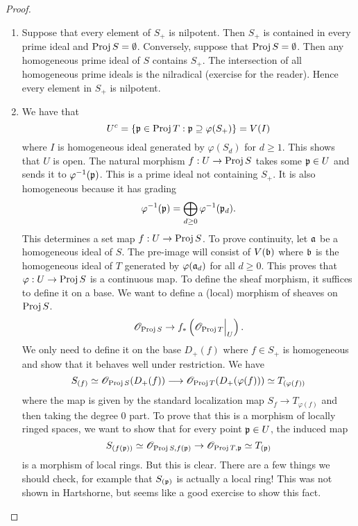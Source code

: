\documentclass[]{pcmi}
\theoremstyle{plain}
\theoremstyle{definition}
\theoremstyle{remark}
\begin{document}
\begin{proof}
    \phantom{h}
    \begin{enumerate}[label = (\alph*)]
        \item Suppose that every element of $S_+$ is nilpotent. Then $S_+$ is contained in every prime ideal and $\operatorname{Proj} S = \emptyset$. Conversely, suppose that $\operatorname{Proj} S = \emptyset$. Then any homogeneous prime ideal of $S$ contains $S_+$. The intersection of all homogeneous prime ideals is the nilradical (exercise for the reader). Hence every element in $S_+$ is nilpotent. 
        \item We have that  
        \[
            U^c = \left\{ \mathfrak{p} \in \operatorname{Proj} T : \mathfrak{p} \supseteq \varphi(S_+) \right\} = V(I)
        \]
        where $I$ is homogeneous ideal generated by $\varphi(S_d)$ for $d \geq 1$. This shows that $U$ is open. The natural morphism $f : U \to \operatorname{Proj} S$ takes some $\mathfrak{p} \in U$ and sends it to $\varphi^{-1}(\mathfrak{p})$. This is a prime ideal not containing $S_+$. It is also homogeneous because it has grading 
        \[
            \varphi^{-1}(\mathfrak{p}) = \bigoplus_{d \geq 0} \varphi^{-1}(\mathfrak{p}_d). 
        \]
        This determines a set map $f : U \to \operatorname{Proj} S$. To prove continuity, let $\mathfrak{a}$ be a homogeneous ideal of $S$. The pre-image will consist of $V(\mathfrak{b})$ where $\mathfrak{b}$ is the homogeneous ideal of $T$ generated by $\varphi(\mathfrak{a}_d)$ for all $d \geq 0$. This proves that $\varphi : U \to \operatorname{Proj} S$ is a continuous map. To define the sheaf morphism, it suffices to define it on a base. We want to define a (local) morphism of sheaves on $\operatorname{Proj} S$. 
        \[
            \mathscr{O}_{\operatorname{Proj} S} \to f_* \left( \mathscr{O}_{\operatorname{Proj} T} \Big|_U \right).
        \]
        We only need to define it on the base $D_+(f)$ where $f \in S_+$ is homogeneous and show that it behaves well under restriction. We have 
        \[
            S_{(f)} \simeq \mathscr{O}_{\operatorname{Proj} S}(D_+(f)) \longrightarrow \mathscr{O}_{\operatorname{Proj} T}(D_+(\varphi(f))) \simeq T_{(\varphi(f))}
        \]
        where the map is given by the standard localization map $S_f \to T_{\varphi(f)}$ and then taking the degree $0$ part. To prove that this is a morphism of locally ringed spaces, we want to show that for every point $\mathfrak{p} \in U$, the induced map 
        \[
            S_{(f(\mathfrak{p}))} \simeq \mathscr{O}_{\operatorname{Proj} S, f(\mathfrak{p})} \to \mathscr{O}_{\operatorname{Proj} T, \mathfrak{p}} \simeq T_{(\mathfrak{p})}
        \] 
        is a morphism of local rings. But this is clear. There are a few things we should check, for example that $S_{(\mathfrak{p})}$ is actually a local ring! This was not shown in Hartshorne, but seems like a good exercise to show this fact. 


\end{enumerate}
\end{proof}
\end{document}
